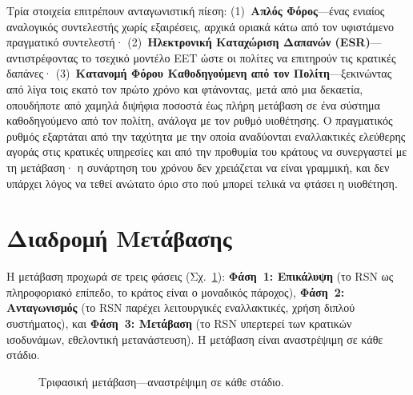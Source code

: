 \documentclass[11pt,a4paper,twocolumn]{article}
\begin{document}
Τρία στοιχεία επιτρέπουν ανταγωνιστική πίεση: (1)~\textbf{Απλός Φόρος}---ένας ενιαίος αναλογικός συντελεστής χωρίς εξαιρέσεις, αρχικά οριακά κάτω από τον υφιστάμενο πραγματικό συντελεστή· (2)~\textbf{Ηλεκτρονική Καταχώριση Δαπανών (ESR)}---αντιστρέφοντας το τσεχικό μοντέλο EET ώστε οι πολίτες να επιτηρούν τις κρατικές δαπάνες· (3)~\textbf{Κατανομή Φόρου Καθοδηγούμενη από τον Πολίτη}---ξεκινώντας από λίγα τοις εκατό τον πρώτο χρόνο και φτάνοντας, μετά από μια δεκαετία, οπουδήποτε από χαμηλά διψήφια ποσοστά έως πλήρη μετάβαση σε ένα σύστημα καθοδηγούμενο από τον πολίτη, ανάλογα με τον ρυθμό υιοθέτησης. Ο πραγματικός ρυθμός εξαρτάται από την ταχύτητα με την οποία αναδύονται εναλλακτικές ελεύθερης αγοράς στις κρατικές υπηρεσίες και από την προθυμία του κράτους να συνεργαστεί με τη μετάβαση· η συνάρτηση του χρόνου δεν χρειάζεται να είναι γραμμική, και δεν υπάρχει λόγος να τεθεί ανώτατο όριο στο πού μπορεί τελικά να φτάσει η υιοθέτηση.

\section{Διαδρομή Μετάβασης}

Η μετάβαση προχωρά σε τρεις φάσεις (Σχ.~\ref{fig:migration}): \textbf{Φάση~1: Επικάλυψη} (το RSN ως πληροφοριακό επίπεδο, το κράτος είναι ο μοναδικός πάροχος), \textbf{Φάση~2: Ανταγωνισμός} (το RSN παρέχει λειτουργικές εναλλακτικές, χρήση διπλού συστήματος), και \textbf{Φάση~3: Μετάβαση} (το RSN υπερτερεί των κρατικών ισοδυνάμων, εθελοντική μετανάστευση). Η μετάβαση είναι αναστρέψιμη σε κάθε στάδιο.

\begin{figure}[ht]
\centering
{}
\caption{Τριφασική μετάβαση---αναστρέψιμη σε κάθε στάδιο.}
\label{fig:migration}
\end{figure}
\end{document}
